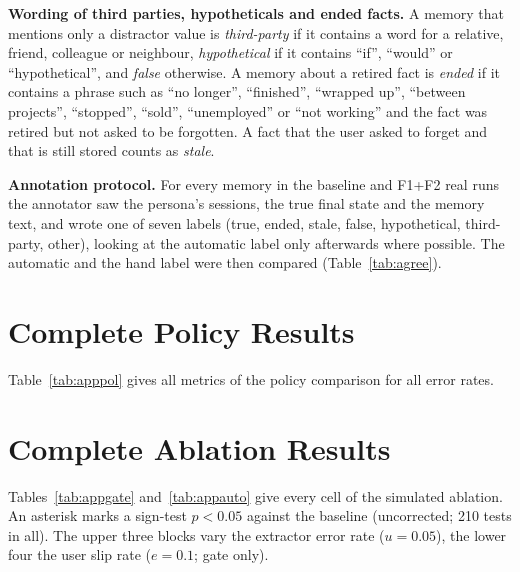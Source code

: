 \IfFileExists{IEEEtran.cls}{\documentclass[journal]{IEEEtran}\def\HAVEIEEE{1}}{\documentclass[10pt,twocolumn]{article}\usepackage[margin=0.7in,columnsep=0.25in]{geometry}}
\begin{document}
\textbf{Wording of third parties, hypotheticals and ended facts.} A memory that mentions only a distractor value is \emph{third-party} if it contains a word for a relative, friend, colleague or neighbour, \emph{hypothetical} if it contains ``if'', ``would'' or ``hypothetical'', and \emph{false} otherwise. A memory about a retired fact is \emph{ended} if it contains a phrase such as ``no longer'', ``finished'', ``wrapped up'', ``between projects'', ``stopped'', ``sold'', ``unemployed'' or ``not working'' and the fact was retired but not asked to be forgotten. A fact that the user asked to forget and that is still stored counts as \emph{stale}.

\textbf{Annotation protocol.} For every memory in the baseline and F1+F2 real runs the annotator saw the persona's sessions, the true final state and the memory text, and wrote one of seven labels (true, ended, stale, false, hypothetical, third-party, other), looking at the automatic label only afterwards where possible. The automatic and the hand label were then compared (Table~\ref{tab:agree}).

\section{Complete Policy Results}
Table~\ref{tab:apppol} gives all metrics of the policy comparison for all error rates.

\begin{table}[!ht]
\centering\footnotesize\renewcommand{\arraystretch}{0.85}
\caption{All policies, all extractor error rates (simulated, $u=0.05$; mean per persona).}
\label{tab:apppol}
\end{table}

\FloatBarrier
\section{Complete Ablation Results}
Tables~\ref{tab:appgate} and~\ref{tab:appauto} give every cell of the simulated ablation. An asterisk marks a sign-test $p<0.05$ against the baseline (uncorrected; 210 tests in all). The upper three blocks vary the extractor error rate ($u=0.05$), the lower four the user slip rate ($e=0.1$; gate only).

\begin{table}[!ht]
\centering\footnotesize\renewcommand{\arraystretch}{0.85}
\caption{Ablation, gate policy: all cells (60 paired persona runs each). * : uncorrected $p<0.05$.}
\label{tab:appgate}
\end{table}
\end{document}
